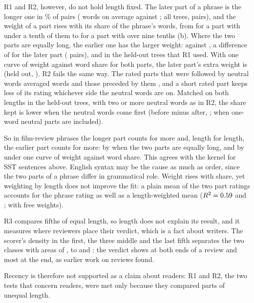 R1 and R2, however, do not hold length fixed. The later part of a phrase is the longer one in \ptLaterLonger\% of pairs (\ptWordsLater{} words on average against \ptWordsEarlier; all trees, \ptN{} pairs), and the weight of a part rises with its share of the phrase's words, from \ptShareLo{} for a part with under a tenth of them to \ptShareHi{} for a part with over nine tenths (b). Where the two parts are equally long, the earlier one has the larger weight: \ptEqEarlier{} against \ptEqLater, a difference of \ptEqDiff{} \ptEqDiffCI{} for the later part (\ptEqN{} pairs), and \ptEqDiffHeld{} \ptEqDiffHeldCI{} in the held-out trees that R1 used. With one curve of weight against word share for both parts, the later part's extra weight is \ptOrder{} \ptOrderCI{} (held out, \ptOrderHeld{} \ptOrderHeldCI). R2 fails the same way. The rated parts that were followed by neutral words averaged \ptRatedAfter{} words and those preceded by them \ptRatedBefore, and a short rated part keeps less of its rating whichever side the neutral words are on. Matched on both lengths in the held-out trees, with two or more neutral words as in R2, the share kept is lower when the neutral words come first (before minus after, \ptDilTwoHeld{} \ptDilTwoHeldCI; \ptDilHeld{} \ptDilHeldCI{} when one-word neutral parts are included).

So in film-review phrases the longer part counts for more and, length for length, the earlier part counts for more: by \ptEqAbs{} when the two parts are equally long, and by \ptOrderAbs{} under one curve of weight against word share. This agrees with the kernel for SST sentences above. English syntax may be the cause as much as order, since the two parts of a phrase differ in grammatical role. Weight rises with share, yet weighting by length does not improve the fit: a plain mean of the two part ratings accounts for the phrase rating as well as a length-weighted mean ($R^2=0.59$ and \ptRsqLength; \ptRsqFree{} with free weights).

R3 compares fifths of equal length, so length does not explain its result, and it measures where reviewers place their verdict, which is a fact about writers. The scorer's density in the first, the three middle and the last fifth separates the two classes with areas of \imdbFifthOne, \imdbMiddleLo{} to \imdbMiddleHi{} and \imdbFifthFive: the verdict shows at both ends of a review and most at the end, as earlier work on reviews found\cite{pang2004,taboada2004,raychev2009,becker2010}.

Recency is therefore not supported as a claim about readers: R1 and R2, the two tests that concern readers, were met only because they compared parts of unequal length.

